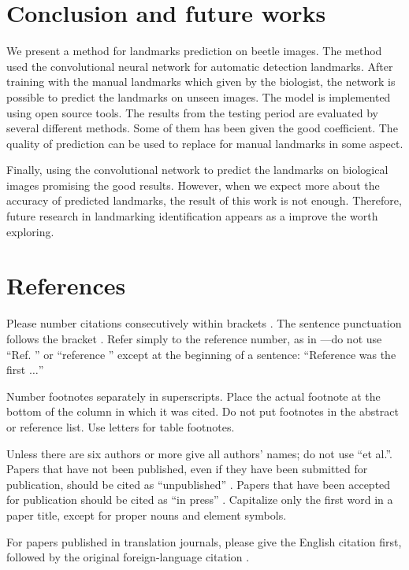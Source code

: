 \documentclass[conference]{IEEEtran}
\begin{document}
\section{Conclusion and future works}
We present a method for landmarks prediction on beetle images. The method used the convolutional neural network for automatic detection landmarks. After training with the manual landmarks which given by the biologist, the network is possible to predict the landmarks on unseen images. The model is implemented using open source tools. The results from the testing period are evaluated by several different methods. Some of them has been given the good coefficient. The quality of prediction can be used to replace for manual landmarks in some aspect.

Finally, using the convolutional network to predict the landmarks on biological images promising the good results. However, when we expect more about the accuracy of predicted landmarks, the result of this work is not enough. Therefore, future research in landmarking identification appears as a improve the worth exploring.

\section*{References}

Please number citations consecutively within brackets \cite{b1}. The 
sentence punctuation follows the bracket \cite{b2}. Refer simply to the reference 
number, as in \cite{b3}---do not use ``Ref. \cite{b3}'' or ``reference \cite{b3}'' except at 
the beginning of a sentence: ``Reference \cite{b3} was the first $\ldots$''

Number footnotes separately in superscripts. Place the actual footnote at 
the bottom of the column in which it was cited. Do not put footnotes in the 
abstract or reference list. Use letters for table footnotes.

Unless there are six authors or more give all authors' names; do not use 
``et al.''. Papers that have not been published, even if they have been 
submitted for publication, should be cited as ``unpublished'' \cite{b4}. Papers 
that have been accepted for publication should be cited as ``in press'' \cite{b5}. 
Capitalize only the first word in a paper title, except for proper nouns and 
element symbols.

For papers published in translation journals, please give the English 
citation first, followed by the original foreign-language citation \cite{b6}.
\end{document}
